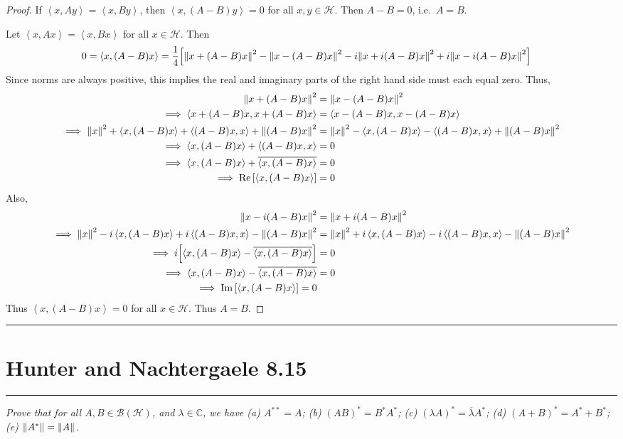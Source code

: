 \documentclass{article} %
\theoremstyle{plain}
\def\Cx{\mathbb{C}}
\newcommand{\VEC}[2]{\left\langle #1, #2 \right\rangle}
\newcommand{\Hilb}{\mathcal{H}}
\newcommand{\problem}[1]{
\vspace{.375cm}
\begin{minipage}{\textwidth}
    \begin{center}
        \noindent\rule{5cm}{1pt}
    \end{center}
    \section{\bf #1}
    \begin{center}
        \noindent\rule{5cm}{1pt}
    \end{center}
    \vspace{0.25cm}
\end{minipage}
}
\numberwithin{equation}{section} %
\numberwithin{figure}{section} %
\numberwithin{table}{section} %
\begin{document}
\begin{proof}
    If $\VEC{x}{Ay} = \VEC{x}{By}$, then $\VEC{x}{(A-B)y} = 0$ for all $x, y \in \Hilb$.  Then $A - B = 0$, i.e.~$A = B$.

    Let $\VEC{x}{Ax} = \VEC{x}{Bx}$ for all $x \in \Hilb$.  Then
    \begin{align*}
        0 = \VEC{x}{(A-B)x} &= \frac{1}{4}\Big[\norm{x + (A-B)x}^2 - \norm{x - (A-B)x}^2 - i\norm{x + i(A-B)x}^2 + i\norm{x - i(A-B)x}^2\Big]
    \end{align*}
    Since norms are always positive, this implies the real and imaginary parts of the right hand side must each equal zero.  Thus,
    \begin{align*}
        \norm{x + (A-B)x}^2 &= \norm{x - (A-B)x}^2 \\
        \implies \VEC{x + (A-B)x}{x + (A-B)x} &= \VEC{x - (A-B)x}{x - (A-B)x} \\
        \implies \norm{x}^2 + \VEC{x}{(A-B)x} + \VEC{(A-B)x}{x} + \norm{(A-B)x}^2 &= \norm{x}^2 - \VEC{x}{(A-B)x} - \VEC{(A-B)x}{x} + \norm{(A-B)x}^2 \\
        \implies \VEC{x}{(A-B)x} + \VEC{(A-B)x}{x} & = 0 \\
        \implies \VEC{x}{(A-B)x} + \overline{\VEC{x}{(A-B)x}} &= 0 \\
        \implies \Re\qty[\VEC{x}{(A-B)x}] &= 0
    \end{align*}
    Also,
    \begin{align*}
        \norm{x - i(A-B)x}^2 &= \norm{x + i(A-B)x}^2 \\
        \implies \norm{x}^2 - i\VEC{x}{(A-B)x} + i\VEC{(A-B)x}{x} - \norm{(A-B)x}^2 &= \norm{x}^2 + i\VEC{x}{(A-B)x} - i\VEC{(A-B)x}{x} - \norm{(A-B)x}^2 \\
        \implies i\qty[\VEC{x}{(A-B)x} - \overline{\VEC{x}{(A-B)x}}] &= 0 \\
        \implies \VEC{x}{(A-B)x} - \overline{\VEC{x}{(A-B)x}} &= 0 \\
        \implies \Im\qty[\VEC{x}{(A-B)x}] = 0
    \end{align*}
    Thus $\VEC{x}{(A-B)x} = 0$ for all $x \in \Hilb$.  Thus $A = B$.
\end{proof}







\problem{Hunter and Nachtergaele 8.15}
\emph{Prove that for all $A,B \in \mathcal{B}(\Hilb)$, and $\lambda \in \Cx$, we have (a) $A^{**} = A$; (b) $(AB)^* = B^*A^*$; (c) $(\lambda A)^* = \overline{\lambda}A^*$; (d) $(A + B)^* = A^* + B^*$; (e) $\norm{A^*} = \norm{A}$.}
\end{document}
